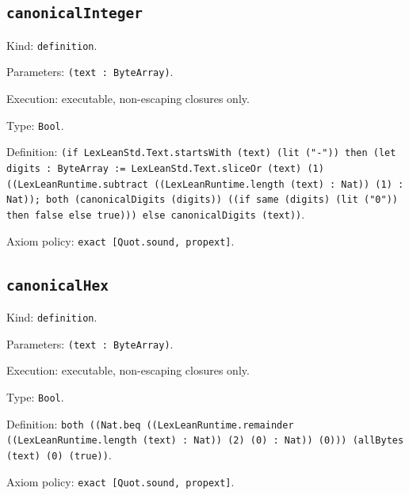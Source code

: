 \documentclass[11pt]{article}
\begin{document}
\subsection*{\texttt{canonicalInteger}}
\noindent Kind: \texttt{definition}.\par
\noindent Parameters: \texttt{(text : ByteArray)}.\par
\noindent Execution: executable, non-escaping closures only.\par
\noindent Type: \texttt{Bool}.\par
\noindent Definition: \texttt{(if LexLeanStd.Text.startsWith (text) (lit ("-")) then (let digits : ByteArray := LexLeanStd.Text.sliceOr (text) (1) ((LexLeanRuntime.subtract ((LexLeanRuntime.length (text) : Nat)) (1) : Nat)); both (canonicalDigits (digits)) ((if same (digits) (lit ("0")) then false else true))) else canonicalDigits (text))}.\par
\noindent Axiom policy: \texttt{exact [Quot.sound, propext]}.\par
\subsection*{\texttt{canonicalHex}}
\noindent Kind: \texttt{definition}.\par
\noindent Parameters: \texttt{(text : ByteArray)}.\par
\noindent Execution: executable, non-escaping closures only.\par
\noindent Type: \texttt{Bool}.\par
\noindent Definition: \texttt{both ((Nat.beq ((LexLeanRuntime.remainder ((LexLeanRuntime.length (text) : Nat)) (2) (0) : Nat)) (0))) (allBytes (text) (0) (true))}.\par
\noindent Axiom policy: \texttt{exact [Quot.sound, propext]}.\par
\end{document}

